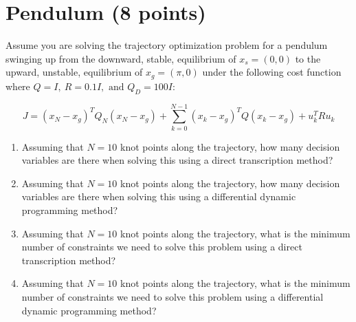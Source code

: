 \documentclass[]{article}
\begin{document}



\newpage



\section{Pendulum (8 points)}
Assume you are solving the trajectory optimization problem for a pendulum swinging up from the downward, stable, equilibrium of $x_s = (0,0)$ to the upward, unstable, equilibrium of $x_g = (\pi,0)$ under the following cost function where $Q=I,\ R = 0.1I,\text{ and } Q_D = 100I$:

\begin{tcolorbox}[left=14pt, arc=0pt, outer arc=0pt, colframe=blue!5, colback=blue!5]
$$J = (x_N-x_g)^TQ_N(x_N-x_g) + \sum_{k=0}^{N-1} (x_k-x_g)^TQ(x_k-x_g) + u_k^TRu_k$$
\end{tcolorbox}

\begin{enumerate}[label=(\alph*)]
    \item Assuming that $N=10$ knot points along the trajectory, how many decision variables are there when solving this using a direct transcription method?
    \item Assuming that $N=10$ knot points along the trajectory, how many decision variables are there when solving this using a differential dynamic programming method?
    \item Assuming that $N=10$ knot points along the trajectory, what is the minimum number of constraints we need to solve this problem using a direct transcription method?
    \item Assuming that $N=10$ knot points along the trajectory, what is the minimum number of constraints we need to solve this problem using a differential dynamic programming method?
\end{enumerate}
\end{document}
